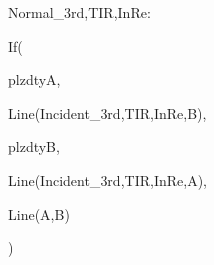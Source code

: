 Normal_{3rd,TIR,InRe}: 
  
  If(

    plzdtyA,
    
    Line(Incident_{3rd,TIR,InRe},B),

    plzdtyB,

    Line(Incident_{3rd,TIR,InRe},A),

    Line(A,B)

  )